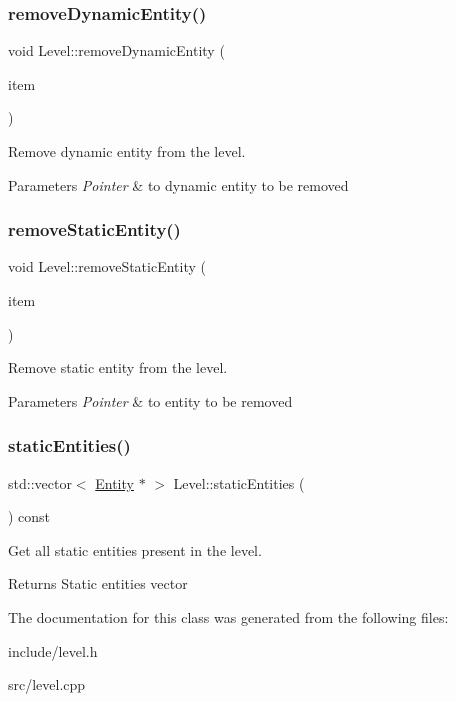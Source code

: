 \subsubsection{\texorpdfstring{remove\+Dynamic\+Entity()}{removeDynamicEntity()}}
{\footnotesize\ttfamily void Level\+::remove\+Dynamic\+Entity (\begin{DoxyParamCaption}\item[{\hyperlink{class_dynamic_entity}{Dynamic\+Entity} $\ast$}]{item }\end{DoxyParamCaption})}



Remove dynamic entity from the level. 


\begin{DoxyParams}{Parameters}
{\em Pointer} & to dynamic entity to be removed \\
\hline
\end{DoxyParams}
\mbox{\label{class_level_a02c2ce88ee6a232d2e192b1ad2982b23}} 
\subsubsection{\texorpdfstring{remove\+Static\+Entity()}{removeStaticEntity()}}
{\footnotesize\ttfamily void Level\+::remove\+Static\+Entity (\begin{DoxyParamCaption}\item[{\hyperlink{class_entity}{Entity} $\ast$}]{item }\end{DoxyParamCaption})}



Remove static entity from the level. 


\begin{DoxyParams}{Parameters}
{\em Pointer} & to entity to be removed \\
\hline
\end{DoxyParams}
\mbox{\label{class_level_a350978da950c180a22a8d108138a3eb8}} 
\subsubsection{\texorpdfstring{static\+Entities()}{staticEntities()}}
{\footnotesize\ttfamily std\+::vector$<$ \hyperlink{class_entity}{Entity} $\ast$ $>$ Level\+::static\+Entities (\begin{DoxyParamCaption}{ }\end{DoxyParamCaption}) const}



Get all static entities present in the level. 

\begin{DoxyReturn}{Returns}
Static entities vector 
\end{DoxyReturn}


The documentation for this class was generated from the following files\+:\begin{DoxyCompactItemize}
\item 
include/level.\+h\item 
src/level.\+cpp\end{DoxyCompactItemize}
